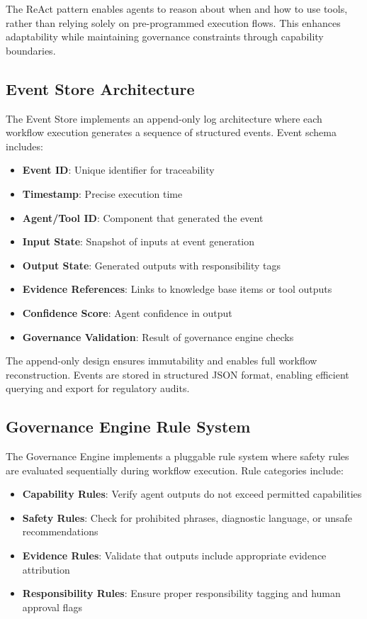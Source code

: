 \documentclass[journal]{IEEEtran}
\begin{document}
The ReAct pattern enables agents to reason about when and how to use tools, rather than relying solely on pre-programmed execution flows. This enhances adaptability while maintaining governance constraints through capability boundaries.

\subsection{Event Store Architecture}
The Event Store implements an append-only log architecture where each workflow execution generates a sequence of structured events. Event schema includes:

\begin{itemize}
    \item \textbf{Event ID}: Unique identifier for traceability
    \item \textbf{Timestamp}: Precise execution time
    \item \textbf{Agent/Tool ID}: Component that generated the event
    \item \textbf{Input State}: Snapshot of inputs at event generation
    \item \textbf{Output State}: Generated outputs with responsibility tags
    \item \textbf{Evidence References}: Links to knowledge base items or tool outputs
    \item \textbf{Confidence Score}: Agent confidence in output
    \item \textbf{Governance Validation}: Result of governance engine checks
\end{itemize}

The append-only design ensures immutability and enables full workflow reconstruction. Events are stored in structured JSON format, enabling efficient querying and export for regulatory audits.

\subsection{Governance Engine Rule System}
The Governance Engine implements a pluggable rule system where safety rules are evaluated sequentially during workflow execution. Rule categories include:

\begin{itemize}
    \item \textbf{Capability Rules}: Verify agent outputs do not exceed permitted capabilities
    \item \textbf{Safety Rules}: Check for prohibited phrases, diagnostic language, or unsafe recommendations
    \item \textbf{Evidence Rules}: Validate that outputs include appropriate evidence attribution
    \item \textbf{Responsibility Rules}: Ensure proper responsibility tagging and human approval flags
\end{itemize}
\end{document}
